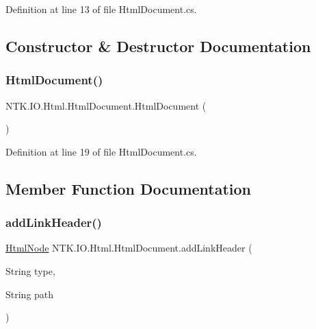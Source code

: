 Definition at line 13 of file Html\+Document.\+cs.



\subsection{Constructor \& Destructor Documentation}
\mbox{\label{class_n_t_k_1_1_i_o_1_1_html_1_1_html_document_ada35928b4653b879beaa5bb373340a0d}} 
\subsubsection{\texorpdfstring{HtmlDocument()}{HtmlDocument()}}
{\footnotesize\ttfamily N\+T\+K.\+I\+O.\+Html.\+Html\+Document.\+Html\+Document (\begin{DoxyParamCaption}{ }\end{DoxyParamCaption})}







Definition at line 19 of file Html\+Document.\+cs.



\subsection{Member Function Documentation}
\mbox{\label{class_n_t_k_1_1_i_o_1_1_html_1_1_html_document_afaf02ab8fd546ab1e2fca93ae9e5464a}} 
\subsubsection{\texorpdfstring{addLinkHeader()}{addLinkHeader()}}
{\footnotesize\ttfamily \mbox{\hyperlink{class_n_t_k_1_1_i_o_1_1_html_1_1_html_node}{Html\+Node}} N\+T\+K.\+I\+O.\+Html.\+Html\+Document.\+add\+Link\+Header (\begin{DoxyParamCaption}\item[{String}]{type,  }\item[{String}]{path }\end{DoxyParamCaption})}






